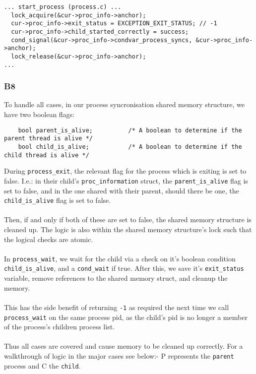 \documentclass[a4wide, 11pt]{article}
\newcommand{\tx}{\texttt}
\begin{document}
\begin{verbatim}
... start_process (process.c) ...
  lock_acquire(&cur->proc_info->anchor);
  cur->proc_info->exit_status = EXCEPTION_EXIT_STATUS; // -1
  cur->proc_info->child_started_correctly = success;
  cond_signal(&cur->proc_info->condvar_process_syncs, &cur->proc_info->anchor);
  lock_release(&cur->proc_info->anchor);
...
\end{verbatim}

\subsubsection{B8}

To handle all cases, in our process syncronisation shared memory structure, we have two boolean flags:

\begin{verbatim}
    bool parent_is_alive;          /* A boolean to determine if the parent thread is alive */
    bool child_is_alive;           /* A boolean to determine if the child thread is alive */
\end{verbatim}
During \tx{process\_exit}, the relevant flag for the process which is exiting is set to false. I.e.: in their child's \tx{proc\_information} struct, the \tx{parent\_is\_alive} flag is set to false, and in the one shared with their parent, should there be one, the \tx{child\_is\_alive} flag is set to false.
\\\\
Then, if and only if both of these are set to false, the shared memory structure is cleaned up. The logic is also within the shared memory structure's lock such that the logical checks are atomic.
\\\\
In \tx{process\_wait}, we wait for the child via a check on it's boolean condition \texttt{child\_is\_alive}, and a \texttt{cond\_wait} if true. After this, we save it's \texttt{exit\_status} variable, remove references to the shared memory struct, and cleanup the memory.
\\\\
This has the side benefit of returning \tx{-1} as required the next time we call \texttt{process\_wait} on the same process pid, as the child's pid is no longer a member of the process's children process list.
\\\\
Thus all cases are covered and cause memory to be cleaned up correctly. For a walkthrough of logic in the major cases see below:- P represents the \texttt{parent} process and C the \texttt{child}.
\end{document}

